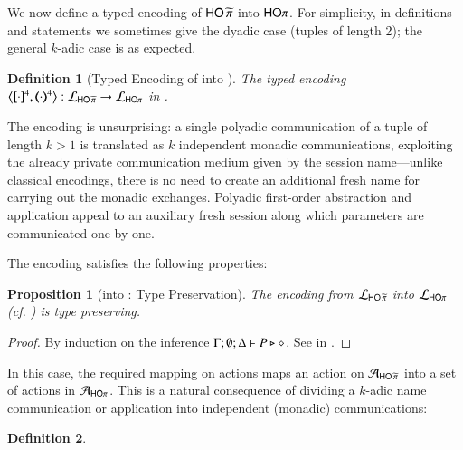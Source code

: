 \documentclass[preprint,11pt]{elsarticle}
\newtheorem{definition}{Definition}[section]
\newtheorem{proposition}{Proposition}[section]
\begin{document}
{{We now define a typed encoding of 
$\mathsf{HO}\,{\widetilde{\pi}}$ into $\mathsf{HO}\pi$. For simplicity, in definitions and statements we sometimes give the dyadic case (tuples of length 2);
the general $k$-adic case is as expected.

\begin{definition}[Typed Encoding of \PHOp into \HOp]
\label{d:enc:phoptohop}
The typed encoding
	$\enco{\pmap{\cdot}{4}, \tmap{\cdot}{4}}: \tyl{L}_{\PHOp} \to \tyl{L}_{\HOp}$ 
in .
\end{definition}

The encoding is unsurprising: a single polyadic communication of a tuple of length $k > 1$
is translated as $k$ independent monadic communications, exploiting the already private communication medium given by the session name---unlike classical encodings, there is no need to create an additional fresh name for carrying out the monadic exchanges.
Polyadic first-order abstraction and application appeal to an auxiliary fresh session along which   parameters are communicated one by one.

The encoding satisfies the following properties:


{
\begin{proposition}[\PHOp into \HOp: Type Preservation]
\label{prop:typepres_pHOp_to_HOp}
The encoding from
		$\mathcal{L}_{\mathsf{HO}\,{\widetilde{\pi}}}$ into $\mathcal{L}_{\mathsf{HO}\pi}$ (cf. )
is type preserving.
\end{proposition}}

\begin{proof}
	By induction on the inference $\Gamma; \emptyset; \Delta \vdash P \triangleright \diamond$.
	See  in .
	\end{proof}
	
In this case, the required mapping on actions 
maps an action on $\mathcal{A}_{\mathsf{HO}\,{\widetilde{\pi}}}$ into a set of actions in $\mathcal{A}_{\mathsf{HO}\pi}$.
This is a natural consequence of dividing a $k$-adic name communication or application into 
independent (monadic) communications:

\begin{definition}


\end{definition}}}
\end{document}

